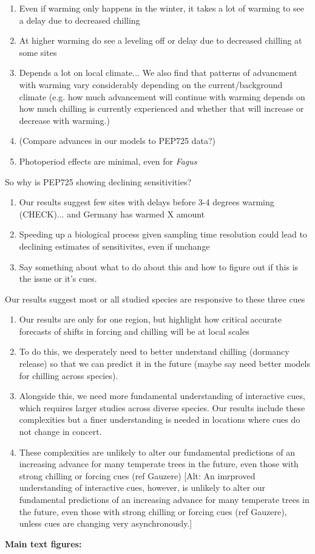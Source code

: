 \documentclass[11pt,letter]{article}
\begin{document}
{\begin{enumerate}
\item Even if warming only happens in the winter, it takes a lot of warming to see a delay due to decreased chilling
\item At higher warming do see a leveling off or delay due to decreased chilling at some sites
\item Depends a lot on local climate... We also find that patterns of advancment with warming vary considerably depending on the current/background climate (e.g. how much advancement will continue with warming depends on how much chilling is currently experienced and whether that will increase or decrease with warming.)
\item (Compare advances in our models to PEP725 data?)
\item Photoperiod effects are minimal, even for \emph{Fagus}
\end{enumerate}
\item So why is PEP725 showing declining sensitivities?
\begin{enumerate}
\item Our results suggest few sites with delays before 3-4 degrees warming (CHECK)... and Germany has warmed X amount
\item Speeding up a biological process given sampling time resolution could lead to declining estimates of sensitivites, even if unchange
\item Say something about what to do about this and how to figure out if this is the issue or it's cues. 
\end{enumerate}
\item Our results suggest most or all studied species are responsive to these three cues
\begin{enumerate}
\item Our results are only for one region, but highlight how critical accurate forecasts of shifts in forcing and chilling will be at local scales
\item To do this, we desperately need to better understand chilling (dormancy release) so that we can predict it in the future (maybe say need better models for chilling across species). 
\item Alongside this, we need more fundamental understanding of interactive cues, which requires larger studies across diverse species. Our results include these complexities but a finer understanding is needed in locations where cues do not change in concert.
\item These complexities are unlikely to alter our fundamental predictions of an increasing advance for many temperate trees in the future, even those with strong chilling or forcing cues (ref Gauzere) [Alt: An imrproved understanding of interactive cues, however, is unlikely to alter our fundamental predictions of an increasing advance for many temperate trees in the future, even those with strong chilling or forcing cues (ref Gauzere), unless cues are changing very asynchronously.]
\end{enumerate}

\bf Main text figures:}
\end{document}

